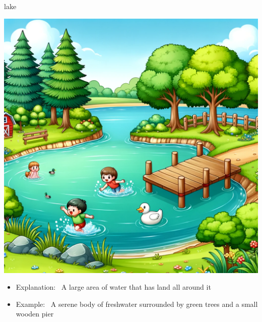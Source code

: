 \documentclass[avery5371, grid,frame]{flashcards}
\begin{document}
\begin{flashcard}{lake}
    \vspace*{\fill}
    \begin{center}
        \begin{minipage}[c]{.45\textwidth}
            \includegraphics[width=\textwidth]{cards/l/lake/lake - A serene body of freshwater surrounded by green trees and a small wooden pier.png}
        \end{minipage}
        \begin{minipage}[c]{.45\textwidth}
            \begin{itemize}\setlength\itemsep{12pt}
            \item Explanation: \ A large area of water that has land all around it
            \item Example: \ A serene body of freshwater surrounded by green trees and a small wooden pier
            \end{itemize}
        \end{minipage}
    \end{center}
    \vspace*{\fill}
\end{flashcard}
\end{document}
